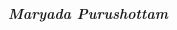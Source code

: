 \thispagestyle{empty}

{ \renewcommand{\baselinestretch}{1.5}
\begin{center}
\begin{spacing}{2}
\end{spacing}
\end{center}



\vspace{15cm}
\begin{flushright}
{ {\Large \em  \textbf{Maryada Purushottam} ~~}}
\end{flushright}}